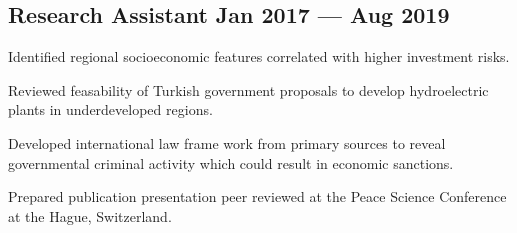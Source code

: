 \documentclass[%
               doublesided,
               paper=a4,
               fontsize=10.5pt
              ]{my-resume}
\begin{document}
{    \subsection{{Research Assistant \hfill Jan 2017 --- Aug 2019}}
    \begin{zitemize}
        \footnotesize
        \item{Identified regional socioeconomic features correlated with higher investment risks.}
        \item{Reviewed feasability of Turkish government proposals to develop hydroelectric plants in underdeveloped regions.}
        \item{Developed international law frame work from primary sources to reveal governmental criminal activity which could result in economic sanctions.}
        \item{Prepared publication presentation peer reviewed at the Peace Science Conference at the Hague, Switzerland.}
        
        
    \end{zitemize}

}
\end{document}
